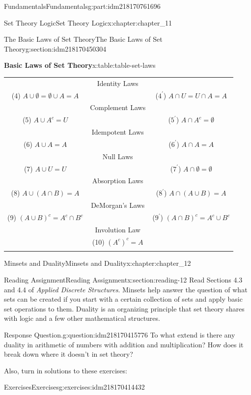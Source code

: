 \documentclass[oneside,10pt,]{book}
\numberwithin{equation}{section}
\newcommand{\hrulethin}  {\noalign{\hrule height 0.04em}}
\begin{document}
\begin{partptx}{Fundamentals}{}{Fundamentals}{}{}{g:part:idm218170761696}
\begin{chapterptx}{Set Theory Logic}{}{Set Theory Logic}{}{}{x:chapter:chapter_11}
\begin{sectionptx}{The Basic Laws of Set Theory}{}{The Basic Laws of Set Theory}{}{}{g:section:idm218170450304}
\begin{tableptx}{\textbf{Basic Laws of Set Theory}}{x:table:table-set-laws}{}
{\begin{tabular}{ccc}
&Identity Laws&\tabularnewline[0pt]
(4) \(A \cup  \emptyset  = \emptyset  \cup  A = A\)&&(\(4^{\prime}\)) \(A \cap  U = U \cap  A = A\)\tabularnewline\hrulethin
&Complement Laws&\tabularnewline[0pt]
(5) \(A\cup A^c= U\)&&(\(5^{\prime}\)) \(A\cap A^c= \emptyset\)\tabularnewline\hrulethin
&Idempotent Laws&\tabularnewline[0pt]
(6) \(A \cup  A = A\)&&(\(6^{\prime}\)) \(A\cap  A = A\)\tabularnewline\hrulethin
&Null Laws&\tabularnewline[0pt]
(7) \(A \cup  U = U\)&&(\(7^{\prime}\)) \(A \cap  \emptyset  =\emptyset\)\tabularnewline\hrulethin
&Absorption Laws&\tabularnewline[0pt]
(8) \(A \cup  (A\cap  B) = A\)&&(\(8^{\prime}\)) \(A\cap (A \cup  B) = A\)\tabularnewline\hrulethin
&DeMorgan's Laws&\tabularnewline[0pt]
(9) \((A \cup  B)^c= A^c\cap  B^c\)&&(\(9^{\prime}\)) \((A\cap  B)^c = A^c \cup  B^c\)\tabularnewline\hrulethin
&Involution Law&\tabularnewline[0pt]
&(10) \((A^c)^c= A\)&\tabularnewline\hrulethin
\end{tabular}
}%
\end{tableptx}%
\end{sectionptx}
\end{chapterptx}
%
\typeout{************************************************}
\typeout{************************************************}
%
\begin{chapterptx}{Minsets and Duality}{}{Minsets and Duality}{}{}{x:chapter:chapter_12}
\index{}%
%
%
\typeout{************************************************}
\typeout{************************************************}
%
\begin{sectionptx}{Reading Assignment}{}{Reading Assignment}{}{}{x:section:reading-12}
Read Sections 4.3 and 4.4 of \emph{Applied Discrete Structures}. Minsets help answer the question of what sets can be created if you start with a certain collection of sets and apply basic set operations to them.   Duality is an organizing principle that set theory shares with logic and a few other mathematical structures.%
\begin{question}{Response Question.}{g:question:idm218170415776}%
To what extend is there any duality in arithmetic of numbers with addition and multiplication?  How does it break down where it doesn't in set theory?%
\end{question}
Also, turn in solutions to these exercises:%
%
%
\typeout{************************************************}
\typeout{************************************************}
%
\begin{exercises-subsection-numberless}{Exercises}{}{Exercises}{}{}{g:exercises:idm218170414432}

\end{exercises-subsection-numberless}
\end{sectionptx}
\end{chapterptx}
\end{partptx}
\end{document}
